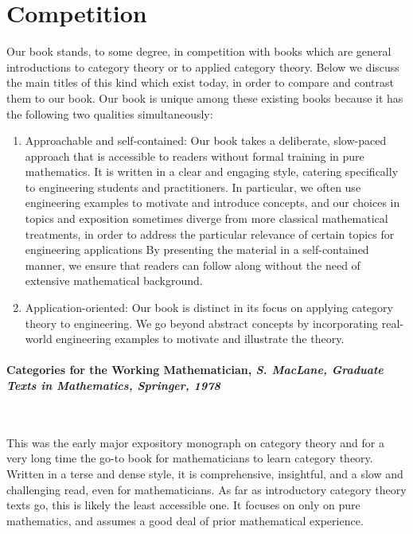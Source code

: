 \documentclass[10pt, article, one side]{memoir}
\begin{document}
    \section{Competition}
    \label{sec:competition}

    Our book stands, to some degree, in competition with books which are general introductions to category theory or to applied category theory.
    Below we discuss the main titles of this kind which exist today, in order to compare and contrast them to our book.
    Our book is unique among these existing books because it has the following two qualities simultaneously:
    \begin{enumerate}
        \item Approachable and self-contained: Our book takes a deliberate, slow-paced approach that is accessible to readers without formal training in pure mathematics.
              It is written in a clear and engaging style, catering specifically to engineering students and practitioners.
              In particular, we often use engineering examples to motivate and introduce concepts, and our choices in topics and exposition sometimes diverge from more classical mathematical treatments, in order to address the particular relevance of certain topics for engineering applications
              By presenting the material in a self-contained manner, we ensure that readers can follow along without the need of extensive mathematical background.

        \item Application-oriented: Our book is distinct in its focus on applying category theory to engineering.
              We go beyond abstract concepts by incorporating real-world engineering examples to motivate and illustrate the theory.
    \end{enumerate}

    \paragraph{Categories for the Working Mathematician, \emph{S.
            MacLane, Graduate Texts in Mathematics, Springer, 1978}~\cite{mac2013categories}}
    \

    This was the early major expository monograph on category theory and for a very long time the go-to book for mathematicians to learn category theory.
    Written in a terse and dense style, it is comprehensive, insightful, and a slow and challenging read, even for mathematicians.
    As far as introductory category theory texts go, this is likely the least accessible one.
    It focuses on only on pure mathematics, and assumes a good deal of prior mathematical experience.
\end{document}
